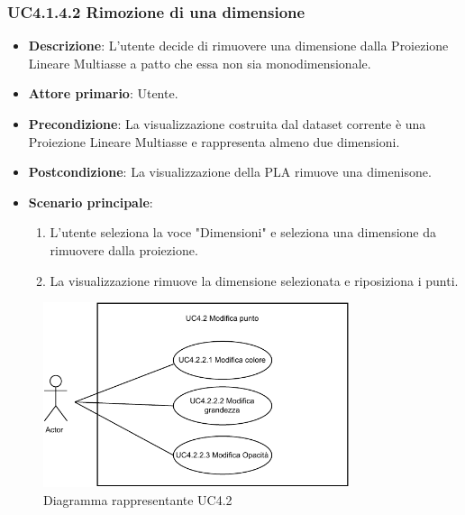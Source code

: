 \subsubsection{UC4.1.4.2 Rimozione di una dimensione}
\label{subsec:uc4.1.4.2}
\begin{itemize}
    \item \textbf{Descrizione}: L’utente decide di rimuovere una dimensione dalla Proiezione Lineare Multiasse
                                a patto che essa non sia monodimensionale.

    \item \textbf{Attore primario}: Utente.
    
    \item \textbf{Precondizione}:   La visualizzazione costruita dal dataset corrente è una Proiezione Lineare Multiasse
                                    e rappresenta almeno due dimensioni.
    \item \textbf{Postcondizione}:  La visualizzazione della PLA rimuove una dimenisone.

	\item \textbf{Scenario principale}:
        \begin{enumerate}
            \item L'utente seleziona la voce "Dimensioni" e seleziona una dimensione da rimuovere dalla proiezione.
            \item La visualizzazione rimuove la dimensione selezionata e riposiziona i punti.
           
        \end{enumerate}
\end{itemize}


\newpage

\begin{figure}[h]
    \centering
    \includegraphics[width=0.8\textwidth]{componenti/casi-duso/diagrammi/UC4.2.pdf}
    \caption{Diagramma rappresentante UC4.2}
    \label{fig:UC4.2}
\end{figure}


